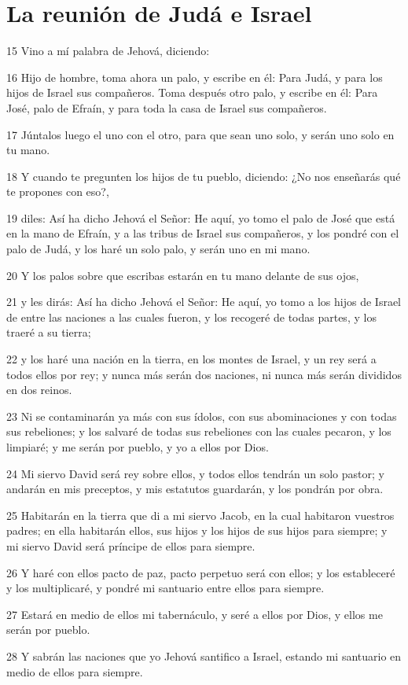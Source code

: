 \section*{La reunión de Judá e Israel}

\par 15 Vino a mí palabra de Jehová, diciendo:
\par 16 Hijo de hombre, toma ahora un palo, y escribe en él: Para Judá, y para los hijos de Israel sus compañeros. Toma después otro palo, y escribe en él: Para José, palo de Efraín, y para toda la casa de Israel sus compañeros.
\par 17 Júntalos luego el uno con el otro, para que sean uno solo, y serán uno solo en tu mano.
\par 18 Y cuando te pregunten los hijos de tu pueblo, diciendo: ¿No nos enseñarás qué te propones con eso?,
\par 19 diles: Así ha dicho Jehová el Señor: He aquí, yo tomo el palo de José que está en la mano de Efraín, y a las tribus de Israel sus compañeros, y los pondré con el palo de Judá, y los haré un solo palo, y serán uno en mi mano.
\par 20 Y los palos sobre que escribas estarán en tu mano delante de sus ojos,
\par 21 y les dirás: Así ha dicho Jehová el Señor: He aquí, yo tomo a los hijos de Israel de entre las naciones a las cuales fueron, y los recogeré de todas partes, y los traeré a su tierra;
\par 22 y los haré una nación en la tierra, en los montes de Israel, y un rey será a todos ellos por rey; y nunca más serán dos naciones, ni nunca más serán divididos en dos reinos.
\par 23 Ni se contaminarán ya más con sus ídolos, con sus abominaciones y con todas sus rebeliones; y los salvaré de todas sus rebeliones con las cuales pecaron, y los limpiaré; y me serán por pueblo, y yo a ellos por Dios.
\par 24 Mi siervo David será rey sobre ellos, y todos ellos tendrán un solo pastor; y andarán en mis preceptos, y mis estatutos guardarán, y los pondrán por obra.
\par 25 Habitarán en la tierra que di a mi siervo Jacob, en la cual habitaron vuestros padres; en ella habitarán ellos, sus hijos y los hijos de sus hijos para siempre; y mi siervo David será príncipe de ellos para siempre.
\par 26 Y haré con ellos pacto de paz, pacto perpetuo será con ellos; y los estableceré y los multiplicaré, y pondré mi santuario entre ellos para siempre.
\par 27 Estará en medio de ellos mi tabernáculo, y seré a ellos por Dios, y ellos me serán por pueblo. 
\par 28 Y sabrán las naciones que yo Jehová santifico a Israel, estando mi santuario en medio de ellos para siempre.


